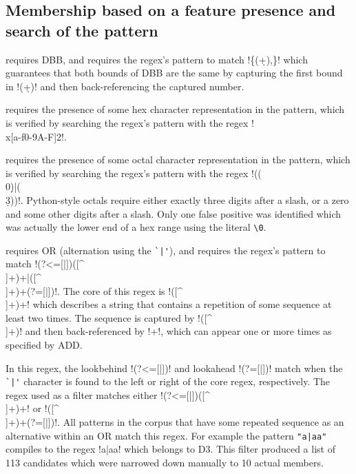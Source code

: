 \subsection{Membership based on a feature presence and search of the pattern}
\begin{description} \itemsep -1pt
\item[S3] requires DBB, and requires the regex's pattern to match \cverb!\{(\d+),\1\}! which guarantees that both bounds of DBB are the same by capturing the first bound in \cverb!(\d+)! and then back-referencing the captured number.
\item[T2] requires the presence of some hex character representation in the pattern, which is verified by searching the regex's pattern with the regex \cverb!\\x[a-f0-9A-F]{2}!.
\item[T4] requires the presence of some octal character representation in the pattern, which is verified by searching the regex's pattern with the regex \cverb!((\\0\d*)|(\\\d{3}))!.  Python-style octals require either exactly three digits after a slash, or a zero and some other digits after a slash.  Only one false positive was identified which was actually the lower end of a hex range using the literal \verb!\0!.
\item[D3] requires OR (alternation using the \verb!`|'!), and requires the regex's pattern to match \cverb!(?<=[|])([^ \\]+)\1+|([^ \\]+)\1+(?=[|])!.  The core of this regex is \cverb!([^ \\]+)\1+! which describes a string that contains a repetition of some sequence at least two times.  The sequence is captured by \cverb!([^ \\]+)! and then back-referenced by \cverb!\1+!, which can appear one or more times as specified by ADD.

In this regex, the lookbehind \cverb!(?<=[|])! and lookahead \cverb!(?=[|])! match when the \verb!`|'! character is found to the left or right of the core regex, respectively.  The regex used as a filter matches either \cverb!(?<=[|])([^ \\]+)\1+! or \cverb!([^ \\]+)\1+(?=[|])!.  All patterns in the corpus that have some repeated sequence as an alternative within an OR match this regex.  For example the pattern \verb!"a|aa"! compiles to the regex \cverb!a|aa! which belongs to D3.  This filter produced a list of 113 candidates which were narrowed down manually to 10 actual members.


\end{description}
